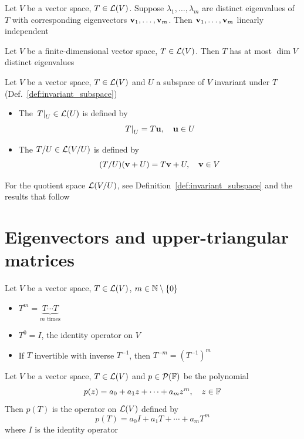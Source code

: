 \documentclass[aspectratio=169]{beamer}
\begin{document}
\begin{frame}
\begin{importanttheorem}
Let $V$ be a vector space, $T\in\mathcal{L}(V)$. Suppose $\lambda_1,\ldots,\lambda_m$ are distinct eigenvalues of $T$ with corresponding eigenvectors $\mathbf{v}_1,\ldots,\mathbf{v}_m$. Then $\mathbf{v}_1,\ldots,\mathbf{v}_m$ linearly independent
\end{importanttheorem}
\vfill
\begin{importanttheorem}
Let $V$ be a finite-dimensional vector space, $T\in\mathcal{L}(V)$. Then $T$ has at most $\dim V$ distinct eigenvalues
\end{importanttheorem}
\end{frame}

\begin{frame}
\begin{definition}
\label{def:restriction_quotient_operators}
Let $V$ be a vector space, $T\in\mathcal{L}(V)$ and $U$ a subspace of $V$ invariant under $T$ (Def.~\ref{def:invariant_subspace})
\begin{itemize}
\item The  $\left.T\right|_{U}\in\mathcal{L}(U)$ is defined by
\[
\left.T\right|_{U}=T\mathbf{u},\quad \mathbf{u}\in U
\]
\item The  $T/U\in\mathcal{L}(V/U)$ is defined by
\[
(T/U)(\mathbf{v}+U)=T\mathbf{v}+U,\quad \mathbf{v}\in V
\]
\end{itemize}
\end{definition}
For the quotient space $\mathcal{L}(V/U)$, see Definition~\ref{def:invariant_subspace} and the results that follow
\end{frame}

\section{Eigenvectors and upper-triangular matrices}

\begin{frame}
\begin{definition}
Let $V$ be a vector space, $T\in\mathcal{L}(V)$, $m\in\mathbb{N}\setminus\{0\}$
\begin{itemize}
\item $T^m=\underbrace{T\cdots T}_{m\textrm{ times}}$
\item $T^0=I$, the identity operator on $V$
\item If $T$ invertible with inverse $T^{-1}$, then $T^{-m}=(T^{-1})^m$
\end{itemize}
\end{definition}
\vfill
\begin{definition}
Let $V$ be a vector space, $T\in\mathcal{L}(V)$ and $p\in\mathcal{P}(\mathbb{F})$ be the polynomial
\[
p(z)=a_0+a_1z+\cdots+a_mz^m,\quad z\in\mathbb{F}
\]
Then $p(T)$ is the operator on $\mathcal{L}(V)$ defined by
\[
p(T)=a_0I+a_1T+\cdots+a_mT^m
\]
where $I$ is the identity operator
\end{definition}
\end{frame}
\end{document}
